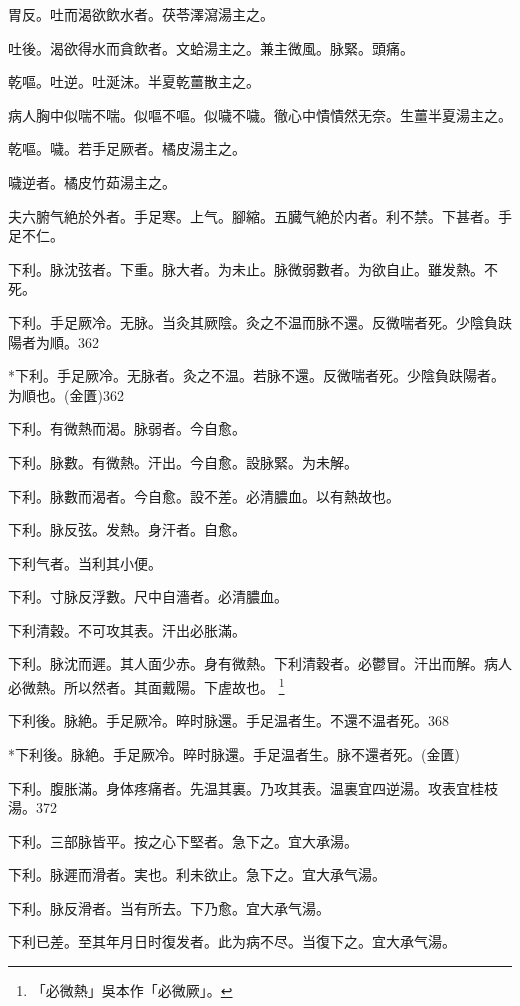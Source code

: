 \documentclass[b5paper,twoside,zihao=-4,UTF8]{ctexbook}
\begin{document}
胃反。吐而渴欲飲水者。茯苓澤瀉湯主之。

吐後。渴欲得水而貪飲者。文蛤湯主之。兼主微風。脉緊。頭痛。

乾嘔。吐逆。吐涎沫。半夏乾薑散主之。

病人胸中似喘不喘。似嘔不嘔。似噦不噦。徹心中憒憒然无奈。生薑半夏湯主之。

乾嘔。噦。若手足厥者。橘皮湯主之。

噦逆者。橘皮竹茹湯主之。

夫六腑气絶於外者。手足寒。上气。腳縮。五臓气絶於内者。利不禁。下甚者。手足不仁。

下利。脉沈弦者。下重。脉大者。为未止。脉微弱數者。为欲自止。雖发熱。不死。

下利。手足厥{冷}。无脉。{当灸其厥陰。}灸之不温{而脉不還}。反微喘者死。少陰負趺陽者为順。362

*下利。手足厥冷。无脉者。灸之不温。若脉不還。反微喘者死。少陰負趺陽者。为順也。(金匱)362

下利。有微熱而渴。脉弱者。今自愈。

下利。脉數。有微熱。汗出。今自愈。設脉緊。为未解。

下利。脉數而渴者。今自愈。設不差。必清膿血。以有熱故也。

下利。脉反弦。发熱。身汗者。自愈。

下利气者。当利其小便。

下利。寸脉反浮數。尺中自濇者。必清膿血。

下利清穀。不可攻其表。汗出必胀滿。

下利。脉沈而遲。其人面少赤。身有微熱。下利清穀者。必鬱冒。汗出而解。病人必微熱。所以然者。其面戴陽。下虗故也。
	\footnote{「必微熱」吳本作「必微厥」。}

下利後。脉絶。手足厥{冷}。晬时脉還。手足温者生。不還{不温}者死。368

*下利後。脉絶。手足厥冷。晬时脉還。手足温者生。脉不還者死。(金匱)

下利。腹胀滿。身体疼痛者。先温其裏。乃攻其表。温裏宜四逆湯。攻表宜桂枝湯。372

下利。三部脉皆平。按之心下堅者。急下之。宜大承湯。

下利。脉遲而滑者。実也。利未欲止。急下之。宜大承气湯。

下利。脉反滑者。当有所去。下乃愈。宜大承气湯。

下利已差。至其{年月日}时復发者。此为病不尽。当{復}下之。宜{大}承气湯。
\end{document}
